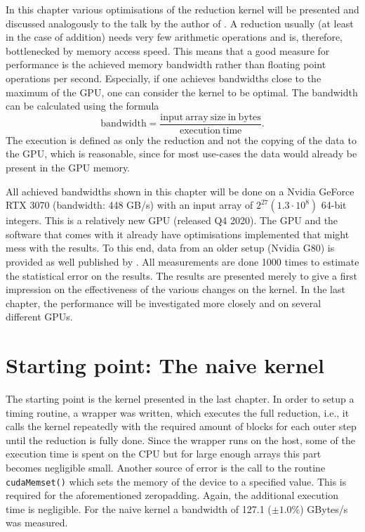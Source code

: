 In this chapter various optimisations of the reduction kernel will be presented and discussed analogously to the talk by the author of \cite{Harris}.
A reduction usually (at least in the case of addition) needs very few arithmetic operations and is, therefore, bottlenecked by memory access speed.
This means that a good measure for performance is the achieved memory bandwidth rather than floating point operations per second.
Especially, if one achieves bandwidths close to the maximum of the GPU, one can consider the kernel to be optimal.
The bandwidth can be calculated using the formula
\begin{equation}
    \mathrm{bandwidth} = \frac{\mathrm{input\ array\ size\ in\ bytes}}{\mathrm{execution\ time}}.
\end{equation}
The execution is defined as only the reduction and not the copying of the data to the GPU, which is reasonable, since for most use-cases the data would already be present in the GPU memory.

All achieved bandwidths shown in this chapter will be done on a Nvidia GeForce RTX 3070 (bandwidth: 448 GB/s) with an input array of \( 2^{27} (1.3\cdot 10^8)\) 64-bit integers. 
This is a relatively new GPU (released Q4 2020).
The GPU and the software that comes with it already have optimisations implemented that might mess with the results.
To this end, data from an older setup (Nvidia G80) is provided as well published by \cite{Harris}.
All measurements are done 1000 times to estimate the statistical error on the results.
The results are presented merely to give a first impression on the effectiveness of the various changes on the kernel.
In the last chapter, the performance will be investigated more closely and on several different GPUs.

\section{Starting point: The naive kernel}
The starting point is the kernel presented in the last chapter.
In order to setup a timing routine, a wrapper was written, which executes the full reduction, i.e., it calls the kernel repeatedly with the required amount of blocks for each outer step until the reduction is fully done. 
Since the wrapper runs on the host, some of the execution time is spent on the CPU but for large enough arrays this part becomes negligible small.
Another source of error is the call to the routine \texttt{cudaMemset()} which sets the memory of the device to a specified value.
This is required for the aforementioned zeropadding.
Again, the additional execution time is negligible.
For the naive kernel a bandwidth of 127.1 (\(\pm 1.0\% \)) GBytes/s was measured.

